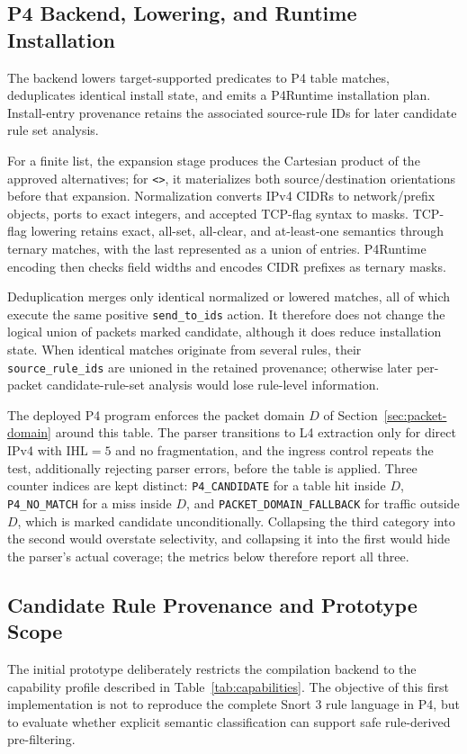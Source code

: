\documentclass{article}
\begin{document}
\subsection{P4 Backend, Lowering, and Runtime Installation}
The backend lowers target-supported predicates to P4 table matches,
deduplicates identical install state, and emits a P4Runtime installation
plan. Install-entry provenance retains the associated source-rule IDs for
later candidate rule set analysis.

For a finite list, the expansion stage produces the Cartesian product of the
approved alternatives; for \texttt{<>}, it materializes both source/destination
orientations before that expansion. Normalization converts IPv4 CIDRs to
network/prefix objects, ports to exact integers, and accepted TCP-flag syntax
to masks. TCP-flag lowering retains exact, all-set, all-clear, and
at-least-one semantics through ternary matches, with the last represented as a
union of entries. P4Runtime encoding then checks field widths and encodes CIDR
prefixes as ternary masks.

Deduplication merges only identical normalized or lowered matches, all of
which execute the same positive \texttt{send\_to\_ids} action. It therefore
does not change the logical union of packets marked candidate, although it
does reduce installation state. When identical matches originate from several
rules, their \texttt{source\_rule\_ids} are unioned in the retained provenance;
otherwise later per-packet candidate-rule-set analysis would lose rule-level
information.

The deployed P4 program enforces the packet domain $D$ of
Section~\ref{sec:packet-domain} around this table. The parser transitions to
L4 extraction only for direct IPv4 with $\mathrm{IHL}=5$ and no
fragmentation, and the ingress control repeats the test, additionally
rejecting parser errors, before the table is applied. Three counter indices
are kept distinct: \texttt{P4\_CANDIDATE} for a table hit inside $D$,
\texttt{P4\_NO\_MATCH} for a miss inside $D$, and
\texttt{PACKET\_DOMAIN\_FALLBACK} for traffic outside $D$, which is marked
candidate unconditionally. Collapsing the third category into the second
would overstate selectivity, and collapsing it into the first would hide the
parser's actual coverage; the metrics below therefore report all three.

\subsection{Candidate Rule Provenance and Prototype Scope}
The initial prototype deliberately restricts the compilation backend
to the capability profile described in Table~\ref{tab:capabilities}.
The objective of this first implementation is not to reproduce the
complete Snort 3 rule language in P4, but to evaluate whether explicit
semantic classification can support safe rule-derived pre-filtering.
\end{document}
